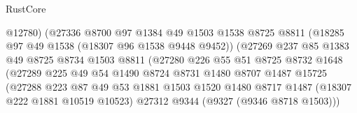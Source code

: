\begin{lexlean}{RustCore}
\begin{coremodule}
                                      @12780)
                                    (@27336
                                      @8700
                                      @97
                                      @1384
                                      @49
                                      @1503
                                      @1538
                                      @8725
                                      @8811
                                      (@18285 @97 @49 @1538 (@18307 @96 @1538 @9448 @9452))
                                      (@27269
                                        @237
                                        @85
                                        @1383
                                        @49
                                        @8725
                                        @8734
                                        @1503
                                        @8811
                                        (@27280
                                          @226
                                          @55
                                          @51
                                          @8725
                                          @8732
                                          @1648
                                          (@27289
                                            @225
                                            @49
                                            @54
                                            @1490
                                            @8724
                                            @8731
                                            @1480
                                            @8707
                                            @1487
                                            @15725
                                            (@27288
                                              @223
                                              @87
                                              @49
                                              @53
                                              @1881
                                              @1503
                                              @1520
                                              @1480
                                              @8717
                                              @1487
                                              (@18307 @222 @1881 @10519 @10523)
                                              @27312
                                              @9344
                                              (@9327 (@9346 @8718 @1503)))

\end{coremodule}
\end{lexlean}
